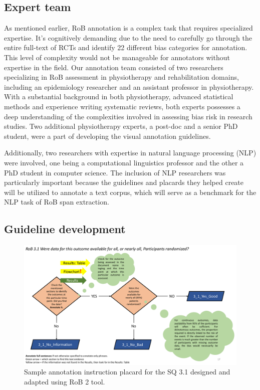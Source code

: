 \documentclass[sn-mathphys,Numbered]{sn-jnl}%
\theoremstyle{thmstyleone}%
\theoremstyle{thmstyletwo}%
\theoremstyle{thmstylethree}%
\begin{document}
\subsection{Expert team}
\label{experts}
%
As mentioned earlier, RoB annotation is a complex task that requires specialized expertise.
It's cognitively demanding due to the need to carefully go through the entire full-text of RCTs and identify 22 different bias categories for annotation.
This level of complexity would not be manageable for annotators without expertise in the field.
Our annotation team consisted of two researchers specializing in RoB assessment in physiotherapy and rehabilitation domains, including an epidemiology researcher and an assistant professor in physiotherapy.
With a substantial background in both physiotherapy, advanced statistical methods and experience writing systematic reviews, both experts possesses a deep understanding of the complexities involved in assessing bias risk in research studies.
Two additional physiotherapy experts, a post-doc and a senior PhD student, were a part of developing the visual annotation guidelines.


Additionally, two researchers with expertise in natural language processing (NLP) were involved, one being a computational linguistics professor and the other a PhD student in computer science.
The inclusion of NLP researchers was particularly important because the guidelines and placards they helped create will be utilized to annotate a text corpus, which will serve as a benchmark for the NLP task of RoB span extraction.
%
%
%
\subsection{Guideline development}
\label{guidelines}
%
%
%
%
\begin{figure}
    \centering
    \includegraphics[width=0.80\columnwidth]{figures/placard_3_1.pdf}
    \caption{Sample annotation instruction placard for the SQ 3.1 designed and adapted using RoB 2 tool.}
    \label{fig:placard}
\end{figure}
%
%
%
\end{document}
